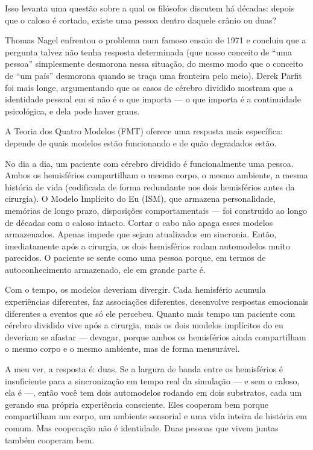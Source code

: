 \documentclass[11pt, twoside, openright]{book}
\begin{document}
Isso levanta uma questão sobre a qual os filósofos discutem há décadas: depois que o caloso é cortado, existe uma pessoa dentro daquele crânio ou duas?

Thomas Nagel enfrentou o problema num famoso ensaio de 1971 e concluiu que a pergunta talvez não tenha resposta determinada (que nosso conceito de ``uma pessoa'' simplesmente desmorona nessa situação, do mesmo modo que o conceito de ``um país'' desmorona quando se traça uma fronteira pelo meio). Derek Parfit foi mais longe, argumentando que os casos de cérebro dividido mostram que a identidade pessoal em si não é o que importa --- o que importa é a continuidade psicológica, e dela pode haver graus.

A Teoria dos Quatro Modelos (FMT) oferece uma resposta mais específica: depende de quais modelos estão funcionando e de quão degradados estão.

No dia a dia, um paciente com cérebro dividido é funcionalmente uma pessoa. Ambos os hemisférios compartilham o mesmo corpo, o mesmo ambiente, a mesma história de vida (codificada de forma redundante nos dois hemisférios antes da cirurgia). O Modelo Implícito do Eu (ISM), que armazena personalidade, memórias de longo prazo, disposições comportamentais --- foi construído ao longo de décadas com o caloso intacto. Cortar o cabo não apaga esses modelos armazenados. Apenas impede que sejam atualizados em sincronia. Então, imediatamente após a cirurgia, os dois hemisférios rodam automodelos muito parecidos. O paciente se sente como uma pessoa porque, em termos de autoconhecimento armazenado, ele em grande parte é.

Com o tempo, os modelos deveriam divergir. Cada hemisfério acumula experiências diferentes, faz associações diferentes, desenvolve respostas emocionais diferentes a eventos que só ele percebeu. Quanto mais tempo um paciente com cérebro dividido vive após a cirurgia, mais os dois modelos implícitos do eu deveriam se afastar --- devagar, porque ambos os hemisférios ainda compartilham o mesmo corpo e o mesmo ambiente, mas de forma mensurável.

A meu ver, a resposta é: duas. Se a largura de banda entre os hemisférios é insuficiente para a sincronização em tempo real da simulação --- e sem o caloso, ela é ---, então você tem dois automodelos rodando em dois substratos, cada um gerando sua própria experiência consciente. Eles cooperam bem porque compartilham um corpo, um ambiente sensorial e uma vida inteira de história em comum. Mas cooperação não é identidade. Duas pessoas que vivem juntas também cooperam bem.
\end{document}
